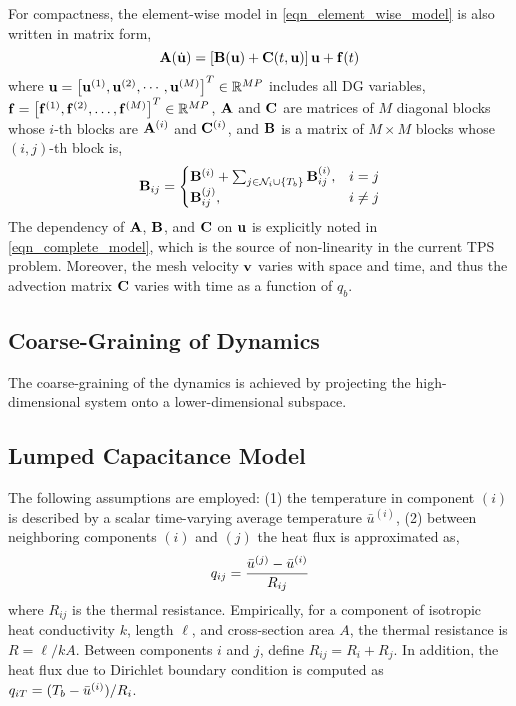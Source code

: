 For compactness, the element-wise model in \cref{eqn_element_wise_model} is also written in matrix form,
\begin{equation}
    \mathbf{A}(\dot{\mathbf{u}}) = \left[\mathbf{B}(\mathbf{u}) + \mathbf{C}(t,\mathbf{u})\right]\mathbf{u} + \mathbf{f}(t)\label{eqn_complete_model}
\end{equation}
where $\mathbf{u} = \left[\mathbf{u}^{(1)},\mathbf{u}^{(2)},\cdots,\mathbf{u}^{(M)}\right]^T\in\mathbb{R}^{MP}$ includes all DG variables, $\mathbf{f}=\left[\mathbf{f}^{(1)},\mathbf{f}^{(2)},\dots,\mathbf{f}^{(M)}\right]^T\in\mathbb{R}^{MP}$, $\mathbf{A}$ and $\mathbf{C}$ are matrices of $M$ diagonal blocks whose $i$-th blocks are $\mathbf{A}^{(i)}$ and $\mathbf{C}^{(i)}$, and $\mathbf{B}$ is a matrix of $M\times M$ blocks whose $(i,j)$-th block is,
\begin{equation}
    \mathbf{B}_{ij} = \begin{cases}
            \mathbf{B}^{(i)} + \sum_{j\in\mathcal{N}_i\cup\left\{T_b\right\}}\mathbf{B}^{(i)}_{ij}, & i=j\\
            \mathbf{B}^{(j)}_{ij}, & i\neq j
        \end{cases}
\end{equation}
The dependency of $\mathbf{A}$, $\mathbf{B}$, and $\mathbf{C}$ on $\mathbf{u}$ is explicitly noted in \cref{eqn_complete_model}, which is the source of non-linearity in the current TPS problem. Moreover, the mesh velocity $\mathbf{v}$ varies with space and time, and thus the advection matrix $\mathbf{C}$ varies with time as a function of $q_b$.

\subsection{Coarse-Graining of Dynamics}

The coarse-graining of the dynamics is achieved by projecting the high-dimensional system onto a lower-dimensional subspace. 

\subsection{Lumped Capacitance Model}

The following assumptions are employed: (1) the temperature in component $(i)$ is described by a scalar time-varying average temperature $\bar{u}^{(i)}$, (2) between neighboring components $(i)$ and $(j)$ the heat flux is approximated as,
\begin{equation}
    q_{ij} = \frac{\bar{u}^{(j)} - \bar{u}^{(i)}}{R_{ij}}
\end{equation}
where $R_{ij}$ is the thermal resistance. Empirically, for a component of isotropic heat conductivity $k$, length $\ell$, and cross-section area $A$, the thermal resistance is $R=\ell/kA$. Between components $i$ and $j$, define $R_{ij}=R_{i} + R_{j}$. In addition, the heat flux due to Dirichlet boundary condition is computed as $q_{iT} = (T_b - \bar{u}^{(i)})/R_{i}$.

